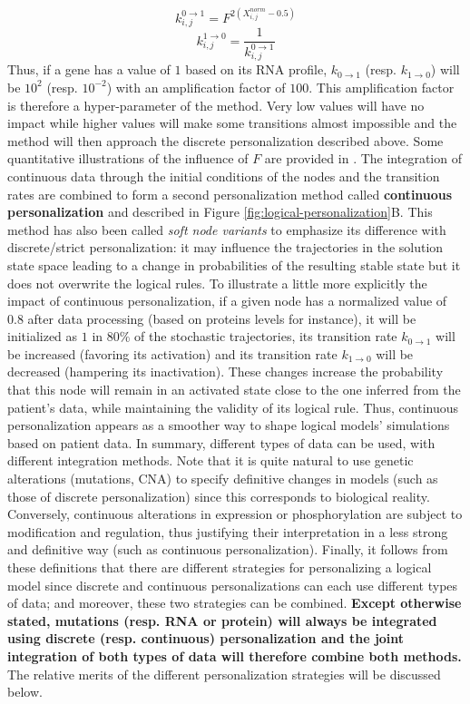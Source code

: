\documentclass[a4paper,12pt,twoside,onecolumn,openright,final,oldfontcommands]{memoir}
\begin{document}
\[k^{0\rightarrow1}_{i,j}=F^{2(X^{norm}_{i,j}-0.5)}\]
\[k^{1\rightarrow0}_{i,j}=\dfrac{1}{k^{0\rightarrow1}_{i,j}}\] Thus, if
a gene has a value of \(1\) based on its RNA profile,
\(k_{0\rightarrow1}\) (resp. \(k_{1\rightarrow0}\)) will be \(10^2\)
(resp. \(10^{-2}\)) with an amplification factor of \(100\). This
amplification factor is therefore a hyper-parameter of the method. Very
low values will have no impact while higher values will make some
transitions almost impossible and the method will then approach the
discrete personalization described above. Some quantitative
illustrations of the influence of \(F\) are provided in
\citet{beal2019personalization}. The integration of continuous data
through the initial conditions of the nodes and the transition rates are
combined to form a second personalization method called
\textbf{continuous personalization} and described in Figure
\ref{fig:logical-personalization}B. This method has also been called
\emph{soft node variants} to emphasize its difference with
discrete/strict personalization: it may influence the trajectories in
the solution state space leading to a change in probabilities of the
resulting stable state but it does not overwrite the logical rules. To
illustrate a little more explicitly the impact of continuous
personalization, if a given node has a normalized value of \(0.8\) after
data processing (based on proteins levels for instance), it will be
initialized as \(1\) in 80\% of the stochastic trajectories, its
transition rate \(k_{0\rightarrow1}\) will be increased (favoring its
activation) and its transition rate \(k_{1\rightarrow0}\) will be
decreased (hampering its inactivation). These changes increase the
probability that this node will remain in an activated state close to
the one inferred from the patient's data, while maintaining the validity
of its logical rule. Thus, continuous personalization appears as a
smoother way to shape logical models' simulations based on patient data.
In summary, different types of data can be used, with different
integration methods. Note that it is quite natural to use genetic
alterations (mutations, CNA) to specify definitive changes in models
(such as those of discrete personalization) since this corresponds to
biological reality. Conversely, continuous alterations in expression or
phosphorylation are subject to modification and regulation, thus
justifying their interpretation in a less strong and definitive way
(such as continuous personalization). Finally, it follows from these
definitions that there are different strategies for personalizing a
logical model since discrete and continuous personalizations can each
use different types of data; and moreover, these two strategies can be
combined. \textbf{Except otherwise stated, mutations (resp. RNA or
protein) will always be integrated using discrete (resp. continuous)
personalization and the joint integration of both types of data will
therefore combine both methods.} The relative merits of the different
personalization strategies will be discussed below.
\end{document}
